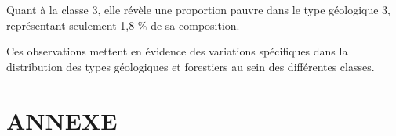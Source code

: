 \documentclass{article}
\begin{document}
Quant à la classe 3, elle révèle une proportion pauvre dans le type géologique 3, représentant seulement 1,8 $\%$ de sa composition.

Ces observations mettent en évidence des variations spécifiques dans la distribution des types géologiques et forestiers au sein des différentes classes.



\newpage
\section{ANNEXE}
\end{document}
